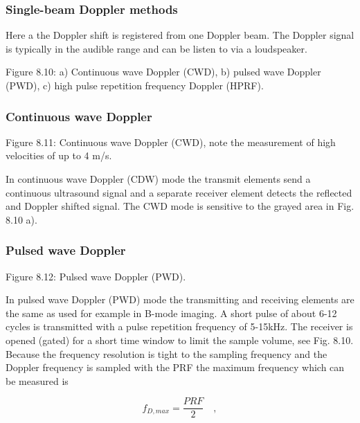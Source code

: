 \documentclass{article}
\begin{document}
    \begin{figure}
        \begin{center}\end{center}
        \caption{}
        \label{}
    \end{figure}
    \subsubsection{Single-beam Doppler
methods}\label{single-beam-doppler-methods}

Here a the Doppler shift is registered from one Doppler beam. The
Doppler signal is typically in the audible range and can be listen to
via a loudspeaker.

Figure 8.10: a) Continuous wave Doppler (CWD), b) pulsed wave Doppler
(PWD), c) high pulse repetition frequency Doppler (HPRF).

\subsubsection{Continuous wave Doppler}\label{continuous-wave-doppler}

Figure 8.11: Continuous wave Doppler (CWD), note the measurement of high
velocities of up to 4 m/s.

In continuous wave Doppler (CDW) mode the transmit elements send a
continuous ultrasound signal and a separate receiver element detects the
reflected and Doppler shifted signal. The CWD mode is sensitive to the
grayed area in Fig. 8.10 a).

\subsubsection{Pulsed wave Doppler}\label{pulsed-wave-doppler}

Figure 8.12: Pulsed wave Doppler (PWD).

In pulsed wave Doppler (PWD) mode the transmitting and receiving
elements are the same as used for example in B-mode imaging. A short
pulse of about 6-12 cycles is transmitted with a pulse repetition
frequency of 5-15kHz. The receiver is opened (gated) for a short time
window to limit the sample volume, see Fig. 8.10. Because the frequency
resolution is tight to the sampling frequency and the Doppler frequency
is sampled with the PRF the maximum frequency which can be measured is

\begin{equation}
f_{D,max}=\frac{PRF}{2} \quad ,
\end{equation}
\end{document}
